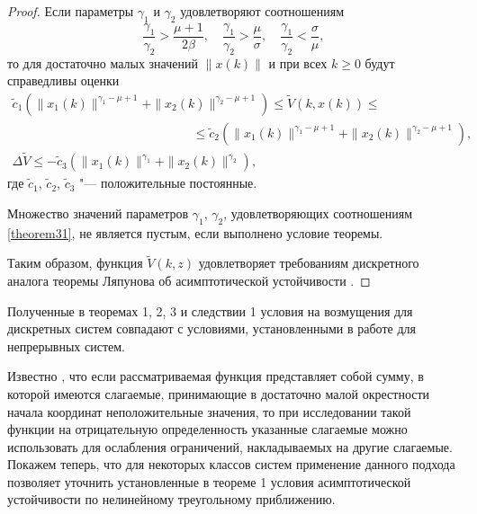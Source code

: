 \begin{proof}
Если параметры $\gamma_1$ и $\gamma_2$ удовлетворяют соотношениям
\begin{equation}
\frac{\gamma_1}{\gamma_2}>\frac{\mu+1}{2\beta},\quad\frac{\gamma_1}{\gamma_2}>\frac{\mu}{\sigma},\quad
\frac{\gamma_1}{\gamma_2}<\frac{\sigma}{\mu}\label{theorem31},
\end{equation}
то для достаточно малых значений $\|x(k)\|$ и
при всех $k\geq 0$ будут справедливы оценки
\begin{gather*}
\widetilde{c}_1
\left(\|x_1(k)\|^{\gamma_1-\mu+1}+\|x_2(k)\|^{\gamma_2-\mu+1}\right)
\leq {\widetilde V}(k,x(k))\leq \\ \hspace{6cm} \leq\widetilde{c}_2
\left(\|x_1(k)\|^{\gamma_1-\mu+1}+\|x_2(k)\|^{\gamma_2-\mu+1}\right),\\
\Delta{\widetilde
V}\leq-\widetilde{c}_3\left(\|x_1(k)\|^{\gamma_1}+\|x_2(k)\|^{\gamma_2}\right), \hspace{3cm}
\end{gather*}
где $\widetilde{c}_1$, $\widetilde{c}_2$, $\widetilde{c}_3$ "---
положительные постоянные.

Множество значений параметров $\gamma_1$, $\gamma_2$, удовлетворяющих соотношениям \eqref{theorem31}, не
является пустым, если выполнено условие теоремы.

Таким образом, функция ${\widetilde V}(k,z)$ удовлетворяет требованиям дискретного аналога теоремы
 Ляпунова об асимптотической устойчивости \cite{sultan:bib8}. 
\end{proof}

\smallskip

\begin{remark}[2] Полученные в теоремах 1, 2, 3 и следствии 1
условия на возмущения для дискретных систем совпадают с условиями,
установленными в работе \cite{sultan:bib14} для непрерывных систем.
\end{remark}

\smallskip

Известно \cite{sultan:bib15}, что если рассматриваемая функция представляет собой
сумму, в которой имеются слагаемые, принимающие в достаточно малой \linebreak
окрестности начала координат неположительные значения, то при
исследовании такой функции на отрицательную определенность
указанные слагаемые можно использовать для ослабления ограничений,
накладываемых на другие слагаемые. Покажем теперь, что для
некоторых классов систем применение данного подхода позволяет
уточнить установленные в теореме 1 условия асимптотической
устойчивости по нелинейному треугольному приближению.


